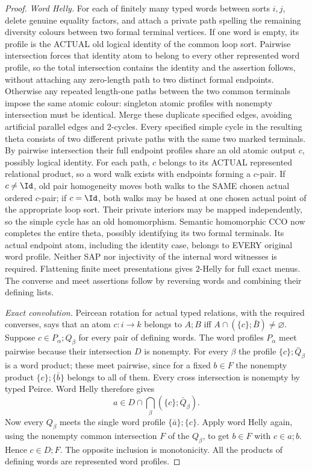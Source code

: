 \begin{proof}
\emph{Word Helly.} For each of finitely many typed words between
sorts $i,j$, delete genuine equality factors, and attach a private
path spelling the remaining diversity colours between two formal
terminal vertices. If one word is empty, its profile is the
ACTUAL old logical identity of the common loop sort.
Pairwise intersection forces that identity atom to
belong to every other represented word profile, so
the total intersection contains the identity and
the assertion follows, without attaching any
zero-length path to two distinct formal endpoints.
Otherwise any repeated length-one paths between
the two common terminals impose the same atomic
colour: singleton atomic profiles with nonempty
intersection must be identical. Merge these
duplicate specified edges, avoiding artificial
parallel edges and 2-cycles.
Every specified simple cycle in the resulting theta
consists of two different private paths with the same
two marked terminals. By pairwise intersection their
full endpoint profiles share an old atomic output
\(c\), possibly logical identity. For each path,
\(c\) belongs to its ACTUAL represented relational
product, so a word walk exists with endpoints
forming a \(c\)-pair. If \(c\ne\Id\), old
pair homogeneity moves both walks to the SAME
chosen actual ordered \(c\)-pair; if \(c=\Id\),
both walks may be based at one chosen actual
point of the appropriate loop sort. Their
private interiors may be mapped independently,
so the simple cycle has an old homomorphism.
Semantic homomorphic CCO now completes the
entire theta, possibly identifying its two
formal terminals. Its actual endpoint atom,
including the identity case, belongs to
EVERY original word profile. Neither SAP nor
injectivity of the internal word witnesses
is required. Flattening
finite meet presentations gives $2$-Helly for full exact menus.
The converse and meet assertions follow by reversing words and
combining their defining lists.

\emph{Exact convolution.} Peircean rotation for actual typed
relations, with the required converses, says that an atom
$c:i\to k$ belongs to $A;B$ iff
$A\cap(\{c\};\bar B)\ne\varnothing$. Suppose
$c\in P_\alpha;Q_\beta$ for every pair of defining words.
The word profiles $P_\alpha$ meet pairwise because their
intersection $D$ is nonempty. For every $\beta$ the profile
$\{c\};\bar Q_\beta$ is a word product; these meet pairwise,
since for a fixed $b\in F$ the nonempty product
$\{c\};\{\bar b\}$ belongs to all of them. Every cross
intersection is nonempty by typed Peirce. Word Helly therefore
gives
\[
 a\in D\cap\bigcap_\beta(\{c\};\bar Q_\beta).
\]
Now every $Q_\beta$ meets the single word profile
$\{\bar a\};\{c\}$. Apply word Helly again, using the
nonempty common intersection $F$ of the $Q_\beta$, to get
$b\in F$ with $c\in a;b$. Hence $c\in D;F$. The opposite
inclusion is monotonicity. All the products of defining words
are represented word profiles.


\end{proof}
